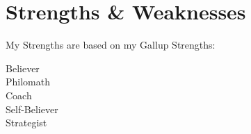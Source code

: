 \documentclass[10pt, a4paper, twocolumn]{article}
\begin{document}
%
%
%
%
%





\clearpage

\section*{Strengths \& Weaknesses}

My Strengths are based on my Gallup Strengths:
\begin{description}
 \item [Believer]
 \item [Philomath]
 \item [Coach]
 \item [Self-Believer]
 \item [Strategist]
\end{description}

\end{document}
